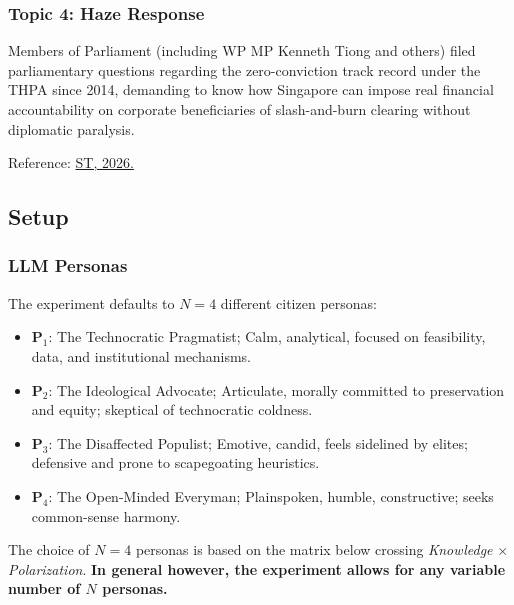 \documentclass[titlepage]{article}
\begin{document}
\subsubsection{Topic 4: Haze Response}
\begin{sidequote}
    Members of Parliament (including WP MP Kenneth Tiong and others) filed parliamentary questions regarding the zero-conviction track record under the THPA since 2014, demanding to know how Singapore can impose real financial accountability on corporate beneficiaries of slash-and-burn clearing without diplomatic paralysis.
\end{sidequote}

Reference:
\href{https://www.straitstimes.com/singapore/why-cant-singapores-anti-haze-law-get-indonesian-companies-to-stop-the-fires}{ST, 2026.}

\subsection{Setup}
\subsubsection{LLM Personas}

The experiment defaults to $N = 4$ different citizen personas:
\begin{itemize}
    \item $\boldsymbol{P}_1$: The Technocratic Pragmatist; Calm, analytical, focused on feasibility, data, and institutional mechanisms.
    \item $\boldsymbol{P}_2$: The Ideological Advocate; Articulate, morally committed to preservation and equity; skeptical of technocratic coldness.
    \item $\boldsymbol{P}_3$: The Disaffected Populist; Emotive, candid, feels sidelined by elites; defensive and prone to scapegoating heuristics.
    \item $\boldsymbol{P}_4$: The Open-Minded Everyman; Plainspoken, humble, constructive; seeks common-sense harmony.
\end{itemize}

The choice of $N = 4$ personas is based on the matrix below crossing \textit{Knowledge} $\times$ \textit{Polarization}. \textbf{In general however, the experiment allows for any variable number of $N$ personas.}
\end{document}
